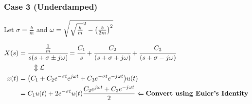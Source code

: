 \documentclass[aspectratio=169,handout]{beamer}
\begin{document}
\begin{frame}
	\frametitle{Case 3 (Underdamped)}
	Let $\sigma = \frac{b}{m}$ and $\omega = \sqrt{\sqrt{\frac{k}{m}}^2 - \qty(\frac{b}{2m})^2}$
	
	\begin{align*}
		X(s) &= \cfrac{\frac{1}{m}}{s (s+\sigma \pm j\omega)} 
		= \cfrac{C_1}{s} + \cfrac{C_2}{(s+\sigma+j\omega)} + \cfrac{C_3}{(s+\sigma - j\omega)}\\
		& \qquad \Updownarrow \mathcal{L}\\
		x(t) &= \qty(C_1 + C_2 e^{-\sigma t}e^{j\omega t} + C_3 e^{-\sigma t} e^{-j\omega t}) u(t)\\
		&= C_1 u(t) + 2 e^{-\sigma t} u(t) \frac{C_2 e^{j\omega t} + C_3 e^{-j\omega t}}{2}
		\Leftarrow \textbf{Convert using Euler's Identity}
	\end{align*}
	


\end{frame}



	



\end{document}
